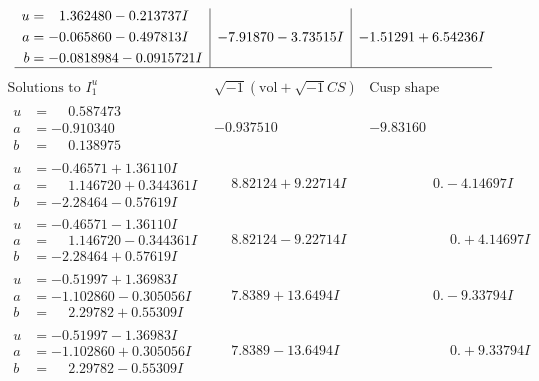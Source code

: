 \documentclass[1p]{elsarticle_modified}
\theoremstyle{definition}
\newcommand{\I}{\sqrt{-1}}
\begin{document}
$$\begin{array}{c|c|c}
\begin{aligned}
u &= \phantom{-}1.362480 - 0.213737 I \\
a &= -0.065860 - 0.497813 I \\
b &= -0.0818984 - 0.0915721 I\end{aligned}
 & -7.91870 - 3.73515 I & -1.51291 + 6.54236 I\\
 \hline 
 \end{array}$$\newpage$$\begin{array}{c|c|c}  
\text{Solutions to }I^u_{1}& \I (\text{vol} + \sqrt{-1}CS) & \text{Cusp shape}\\
 \hline 
\begin{aligned}
u &= \phantom{-}0.587473\phantom{ +0.000000I} \\
a &= -0.910340\phantom{ +0.000000I} \\
b &= \phantom{-}0.138975\phantom{ +0.000000I}\end{aligned}
 & -0.937510\phantom{ +0.000000I} & -9.83160\phantom{ +0.000000I} \\ \hline\begin{aligned}
u &= -0.46571 + 1.36110 I \\
a &= \phantom{-}1.146720 + 0.344361 I \\
b &= -2.28464 - 0.57619 I\end{aligned}
 & \phantom{-}8.82124 + 9.22714 I & \phantom{-0.000000 } 0. - 4.14697 I \\ \hline\begin{aligned}
u &= -0.46571 - 1.36110 I \\
a &= \phantom{-}1.146720 - 0.344361 I \\
b &= -2.28464 + 0.57619 I\end{aligned}
 & \phantom{-}8.82124 - 9.22714 I & \phantom{-0.000000 -}0. + 4.14697 I \\ \hline\begin{aligned}
u &= -0.51997 + 1.36983 I \\
a &= -1.102860 - 0.305056 I \\
b &= \phantom{-}2.29782 + 0.55309 I\end{aligned}
 & \phantom{-}7.8389 + 13.6494 I & \phantom{-0.000000 } 0. - 9.33794 I \\ \hline\begin{aligned}
u &= -0.51997 - 1.36983 I \\
a &= -1.102860 + 0.305056 I \\
b &= \phantom{-}2.29782 - 0.55309 I\end{aligned}
 & \phantom{-}7.8389 - 13.6494 I & \phantom{-0.000000 -}0. + 9.33794 I \\ \hline\begin{aligned}

\end{aligned}
\end{array}$$
\end{document}
